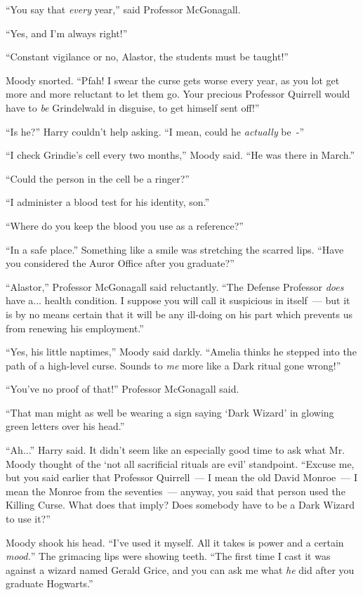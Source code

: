 ``You say that \emph{every} year,'' said Professor McGonagall.

``Yes, and I'm always right!''

``Constant vigilance or no, Alastor, the students must be taught!''

Moody snorted. ``Pfah! I swear the curse gets worse every year, as you lot get more and more reluctant to let them go. Your precious Professor Quirrell would have to \emph{be} Grindelwald in disguise, to get himself sent off!''

``Is he?'' Harry couldn't help asking. ``I mean, could he \emph{actually} be~-''

``I check Grindie's cell every two months,'' Moody said. ``He was there in March.''

``Could the person in the cell be a ringer?''

``I administer a blood test for his identity, son.''

``Where do you keep the blood you use as a reference?''

``In a safe place.'' Something like a smile was stretching the scarred lips. ``Have you considered the Auror Office after you graduate?''

``Alastor,'' Professor McGonagall said reluctantly. ``The Defense Professor \emph{does} have a... health condition. I suppose you will call it suspicious in itself~--- but it is by no means certain that it will be any ill-doing on his part which prevents us from renewing his employment.''

``Yes, his little naptimes,'' Moody said darkly. ``Amelia thinks he stepped into the path of a high-level curse. Sounds to \emph{me} more like a Dark ritual gone wrong!''

``You've no proof of that!'' Professor McGonagall said.

``That man might as well be wearing a sign saying `Dark Wizard' in glowing green letters over his head.''

``Ah...'' Harry said. It didn't seem like an especially good time to ask what Mr. Moody thought of the `not all sacrificial rituals are evil' standpoint. ``Excuse me, but you said earlier that Professor Quirrell~--- I mean the old David Monroe~--- I mean the Monroe from the seventies~--- anyway, you said that person used the Killing Curse. What does that imply? Does somebody have to be a Dark Wizard to use it?''

Moody shook his head. ``I've used it myself. All it takes is power and a certain \emph{mood.}'' The grimacing lips were showing teeth. ``The first time I cast it was against a wizard named Gerald Grice, and you can ask me what \emph{he} did after you graduate Hogwarts.''

